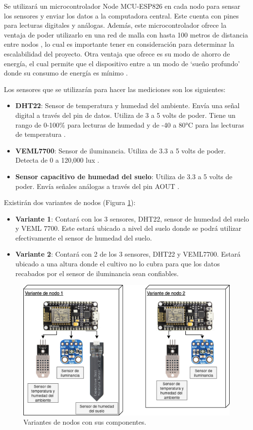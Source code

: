 \begin{itemize}
	Se utilizará un microcontrolador Node MCU-ESP826 en cada nodo para sensar los sensores y enviar los datos a la computadora central. Este cuenta con pines para lecturas digitales y análogas. Además, este microcontrolador ofrece la ventaja de poder utilizarlo en una red de malla con hasta 100 metros de distancia entre nodos \cite{nodemcu_mesh}, lo cual es importante tener en consideración para determinar la escalabilidad del proyecto. Otra ventaja que ofrece es su modo de ahorro de energía, el cual permite que el dispositivo entre a un modo de `sueño profundo' donde su consumo de energía es mínimo \cite{nodemcu_datasheet}. 

	Los sensores que se utilizarán para hacer las mediciones son los siguientes:
	\begin{itemize}
		\item \textbf{DHT22}: Sensor de temperatura y humedad del ambiente. Envía una señal digital a través del pin de datos. Utiliza de 3 a 5 volts de poder. Tiene un rango de 0-100\% para lecturas de humedad y de -40 a 80°C para las lecturas de temperatura \cite{dht22_product_page}.
		\item \textbf{VEML7700}: Sensor de iluminancia. Utiliza de 3.3 a 5 volts de poder. Detecta de 0 a 120,000 lux \cite{veml_product_page}. 
		\item \textbf{Sensor capacitivo de humedad del suelo}: Utiliza de 3.3 a 5 volts de poder. Envía señales análogas a través del pin AOUT \cite{capacitive_soil_sensor_specs}.
	\end{itemize}

	Existirán dos variantes de nodos (Figura \ref{fig:componentes_nodos_wsn}):
	\begin{itemize}
		\item \textbf{Variante 1}: Contará con los 3 sensores, DHT22, sensor de humedad del suelo y VEML 7700. Este estará ubicado a nivel del suelo donde se podrá utilizar efectivamente el sensor de humedad del suelo.
		\item \textbf{Variante 2}: Contará con 2 de los 3 sensores, DHT22 y VEML7700. Estará ubicado a una altura donde el cultivo no lo cubra para que los datos recabados por el sensor de iluminancia sean confiables.
	\end{itemize}

	\begin{figure}[!ht]
		\centering
		\includegraphics[width=.80\linewidth]{imagenes/diagramas/componentes_nodos_wsn.png}
		\caption{Variantes de nodos con sus componentes.}
		\label{fig:componentes_nodos_wsn}
	\end{figure}


\end{itemize}
